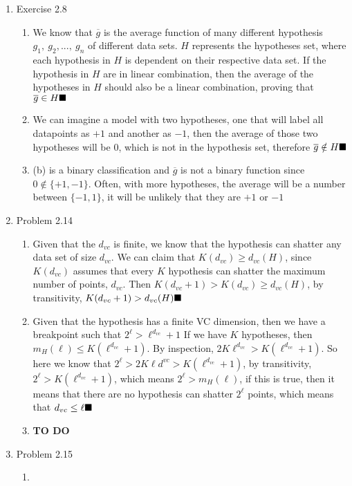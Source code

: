 \documentclass{article}
\begin{document}
    \begin{enumerate}
        \item Exercise 2.8
        \begin{enumerate}[label=(\alph*)]
            \item We know that $\overline{g}$ is the average function of many different hypothesis $g_1,\ g_2,...,\ g_n$ of different data sets. $H$ represents the hypotheses set, where each hypothesis in $H$ is dependent on their respective data set. If the hypothesis in $H$ are in linear combination, then the average of the hypotheses in $H$ should also be a linear combination, proving that $\overline{g} \in H \hfill \blacksquare$
            \item We can imagine a model with two hypotheses, one that will label all datapoints as $+1$ and another as $-1$, then the average of those two hypotheses will be $0$, which is not in the hypothesis set, therefore $\overline{g} \notin H \hfill \blacksquare$
            \item (b) is a binary classification and $\overline{g}$ is not a binary function since $0 \notin \{+1, -1\}$. Often, with more hypotheses, the average will be a number between $\{-1, 1\}$, it will be unlikely that they are $+1$ or $-1$
        \end{enumerate}

        \item Problem 2.14
        \begin{enumerate}
            \item Given that the $d_{vc}$ is finite, we know that the hypothesis can shatter any data set of size $d_{vc}$. We can claim that $K(d_{vc}) \geq d_{vc}(H)$, since $K(d_{vc})$ assumes that every $K$ hypothesis can shatter the maximum number of points, $d_{vc}$. Then $K(d_{vc} + 1) > K(d_{vc}) \geq d_{vc}(H)$, by transitivity, $K(d_{vc} + 1) > d_{vc}(H) \hfill \blacksquare$
            \item Given that the hypothesis has a finite VC dimension, then we have a breakpoint such that $2^\ell > \ell^{d_{vc}} + 1$ If we have $K$ hypotheses, then $m_H(\ell) \leq K(\ell^{d_{vc}}+1)$. By inspection, $2K\ell^{d_{vc}} > K(\ell^{d_{vc}} + 1)$. So here we know that $2^\ell > 2K\ell d^{vc} > K(\ell ^{d_{vc}} + 1)$, by transitivity, $2^\ell > K(\ell ^{d_{vc}} + 1)$, which means $2^\ell > m_H(\ell)$, if this is true, then it means that there are no hypothesis can shatter $2^\ell$ points, which means that $d_{vc} \leq \ell \hfill \blacksquare$
            \item \textbf{TO DO}
        \end{enumerate}

        \item Problem 2.15
        \begin{enumerate}
            \item 
        \end{enumerate}
    \end{enumerate}
\end{document}

